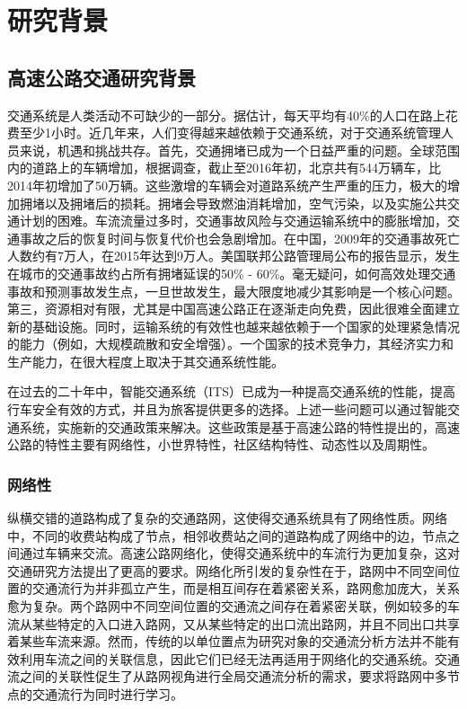 
\section{研究背景}
\subsection{高速公路交通研究背景}

交通系统是人类活动不可缺少的一部分。据估计，每天平均有40\%的人口在路上花费至少1小时。近几年来，人们变得越来越依赖于交通系统，对于交通系统管理人员来说，机遇和挑战共存。首先，交通拥堵已成为一个日益严重的问题。全球范围内的道路上的车辆增加，根据调查，截止至2016年初，北京共有544万辆车，比2014年初增加了50万辆。这些激增的车辆会对道路系统产生严重的压力，极大的增加拥堵以及拥堵后的损耗。拥堵会导致燃油消耗增加，空气污染，以及实施公共交通计划的困难。车流流量过多时，交通事故风险与交通运输系统中的膨胀增加，交通事故之后的恢复时间与恢复代价也会急剧增加。在中国，2009年的交通事故死亡人数约有7万人，在2015年达到9万人。美国联邦公路管理局公布的报告显示，发生在城市的交通事故约占所有拥堵延误的50\% - 60\%。毫无疑问，如何高效处理交通事故和预测事故发生点，一旦世故发生，最大限度地减少其影响是一个核心问题。第三，资源相对有限，尤其是中国高速公路正在逐渐走向免费，因此很难全面建立新的基础设施。同时，运输系统的有效性也越来越依赖于一个国家的处理紧急情况的能力（例如，大规模疏散和安全增强）。一个国家的技术竞争力，其经济实力和生产能力，在很大程度上取决于其交通系统性能。

			在过去的二十年中，智能交通系统（ITS）已成为一种提高交通系统的性能，提高行车安全有效的方式，并且为旅客提供更多的选择。上述一些问题可以通过智能交通系统，实施新的交通政策来解决。这些政策是基于高速公路的特性提出的，高速公路的特性主要有网络性，小世界特性，社区结构特性、动态性以及周期性。

\subsubsection{网络性}
    纵横交错的道路构成了复杂的交通路网，这使得交通系统具有了网络性质。网络中，不同的收费站构成了节点，相邻收费站之间的道路构成了网络中的边，节点之间通过车辆来交流。高速公路网络化，使得交通系统中的车流行为更加复杂，这对交通研究方法提出了更高的要求。网络化所引发的复杂性在于，路网中不同空间位置的交通流行为并非孤立产生，而是相互间存在着紧密关系，路网愈加庞大，关系愈为复杂。两个路网中不同空间位置的交通流之间存在着紧密关联，例如较多的车流从某些特定的入口进入路网，又从某些特定的出口流出路网，并且不同出口共享着某些车流来源。然而，传统的以单位置点为研究对象的交通流分析方法并不能有效利用车流之间的关联信息，因此它们已经无法再适用于网络化的交通系统。交通流之间的关联性促生了从路网视角进行全局交通流分析的需求，要求将路网中多节点的交通流行为同时进行学习。

